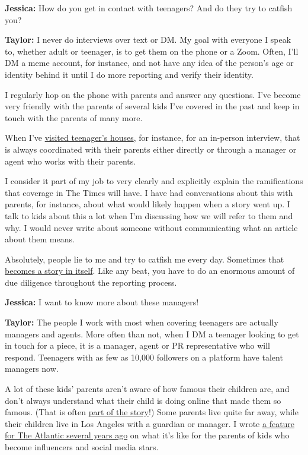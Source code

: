\textbf{Jessica:} How do you get in contact with teenagers? And do they
try to catfish you?

\textbf{Taylor:} I never do interviews over text or DM. My goal with
everyone I speak to, whether adult or teenager, is to get them on the
phone or a Zoom. Often, I'll DM a meme account, for instance, and not
have any idea of the person's age or identity behind it until I do more
reporting and verify their identity.

I regularly hop on the phone with parents and answer any questions. I've
become very friendly with the parents of several kids I've covered in
the past and keep in touch with the parents of many more.

When I've
\href{https://www.nytimes.com/2020/01/03/style/hype-house-los-angeles-tik-tok.html}{visited
teenager's houses}, for instance, for an in-person interview, that is
always coordinated with their parents either directly or through a
manager or agent who works with their parents.

I consider it part of my job to very clearly and explicitly explain the
ramifications that coverage in The Times will have. I have had
conversations about this with parents, for instance, about what would
likely happen when a story went up. I talk to kids about this a lot when
I'm discussing how we will refer to them and why. I would never write
about someone without communicating what an article about them means.

Absolutely, people lie to me and try to catfish me every day. Sometimes
that
\href{https://www.thedailybeast.com/reddits-favorite-high-school-porn-magnate-is-actually-22}{becomes
a story in itself}. Like any beat, you have to do an enormous amount of
due diligence throughout the reporting process.

\textbf{Jessica:} I want to know more about these managers!

\textbf{Taylor:} The people I work with most when covering teenagers are
actually managers and agents. More often than not, when I DM a teenager
looking to get in touch for a piece, it is a manager, agent or PR
representative who will respond. Teenagers with as few as 10,000
followers on a platform have talent managers now.

A lot of these kids' parents aren't aware of how famous their children
are, and don't always understand what their child is doing online that
made them so famous. (That is often
\href{https://www.nytimes.com/2020/02/13/style/the-original-renegade.html}{part
of the story}!) Some parents live quite far away, while their children
live in Los Angeles with a guardian or manager. I wrote
\href{https://www.theatlantic.com/technology/archive/2018/01/raising-a-social-media-star/550418/}{a
feature for The Atlantic several years ago} on what it's like for the
parents of kids who become influencers and social media stars.


